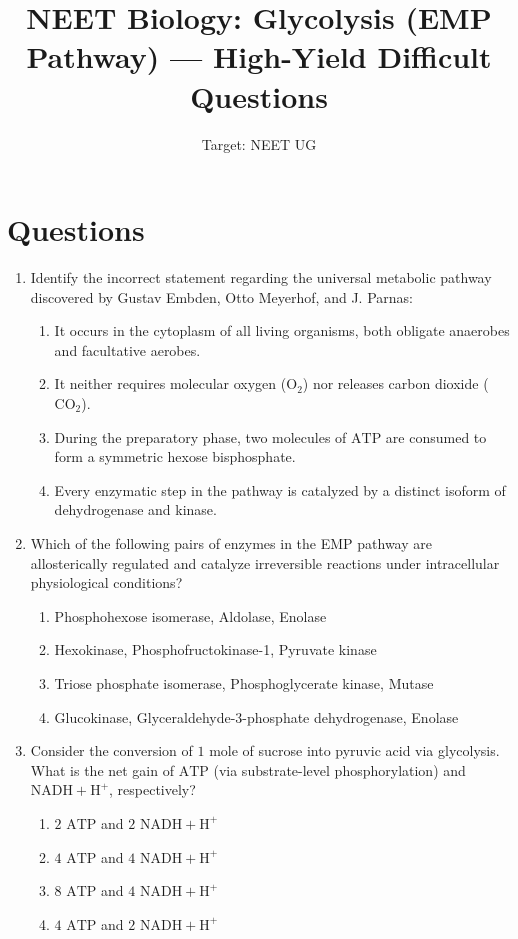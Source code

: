 \documentclass[11pt, a4paper]{article}
\title{\textbf{NEET Biology: Glycolysis (EMP Pathway) — High-Yield Difficult Questions}}
\author{Target: NEET UG}
\date{}
\begin{document}
\maketitle

\section*{Questions}

\begin{enumerate}[label=\textbf{\arabic*.}]

\item Identify the incorrect statement regarding the universal metabolic pathway discovered by Gustav Embden, Otto Meyerhof, and J. Parnas:
\begin{enumerate}[label=(\Alph*)]
    \item It occurs in the cytoplasm of all living organisms, both obligate anaerobes and facultative aerobes.
    \item It neither requires molecular oxygen ($\text{O}_2$) nor releases carbon dioxide ($\text{CO}_2$).
    \item During the preparatory phase, two molecules of $\text{ATP}$ are consumed to form a symmetric hexose bisphosphate.
    \item Every enzymatic step in the pathway is catalyzed by a distinct isoform of dehydrogenase and kinase.
\end{enumerate}

\item Which of the following pairs of enzymes in the EMP pathway are allosterically regulated and catalyze irreversible reactions under intracellular physiological conditions?
\begin{enumerate}[label=(\Alph*)]
    \item Phosphohexose isomerase, Aldolase, Enolase
    \item Hexokinase, Phosphofructokinase-1, Pyruvate kinase
    \item Triose phosphate isomerase, Phosphoglycerate kinase, Mutase
    \item Glucokinase, Glyceraldehyde-3-phosphate dehydrogenase, Enolase
\end{enumerate}

\item Consider the conversion of $1\text{ mole}$ of sucrose into pyruvic acid via glycolysis. What is the net gain of $\text{ATP}$ (via substrate-level phosphorylation) and $\text{NADH} + \text{H}^+$, respectively?
\begin{enumerate}[label=(\Alph*)]
    \item $2\text{ ATP}$ and $2\text{ NADH} + \text{H}^+$
    \item $4\text{ ATP}$ and $4\text{ NADH} + \text{H}^+$
    \item $8\text{ ATP}$ and $4\text{ NADH} + \text{H}^+$
    \item $4\text{ ATP}$ and $2\text{ NADH} + \text{H}^+$
\end{enumerate}


\end{enumerate}
\end{document}
